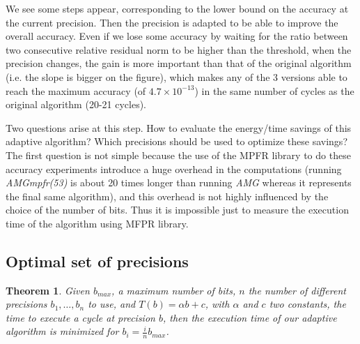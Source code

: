 \documentclass[a4paper,10pt]{article}
\newtheorem{theorem}{Theorem}
\begin{document}
   We see some steps appear, corresponding to the lower bound on the accuracy at the current precision. Then the precision is adapted to be able to improve the overall accuracy. Even if we lose some accuracy by waiting for the ratio
   between two consecutive relative residual norm to be higher than the threshold, when the precision changes, the gain is more important than that of the original algorithm (i.e. the slope is bigger on the figure), which makes any of
   the 3 versions able to reach the maximum accuracy (of $4.7\times 10^{-13}$) in the same number of cycles as the original algorithm (20-21 cycles).
   
   Two questions arise at this step. How to evaluate the energy/time savings of this adaptive algorithm? Which precisions should be used to optimize these savings?\\
   The first question is not simple because the use of the MPFR library to do these accuracy experiments introduce a huge overhead in the computations (running \emph{AMGmpfr(53)} is about 20 times longer than running \emph{AMG} whereas it
   represents the final same algorithm), and this overhead is not highly influenced by the choice of the number of bits. Thus it is impossible just to measure the execution time of the algorithm using MFPR library.
   
   \subsection{Optimal set of precisions}
   
   \begin{theorem}
     Given $b_{max}$, a maximum number of bits, $n$ the number of different precisions $b_1,\dots,b_n$ to use, and $T(b)=\alpha b+c$, with $\alpha$ and $c$ two constants, the time to execute a cycle at precision $b$, then
     the execution time of our adaptive algorithm is minimized for $b_i = \frac{i}{n}b_{max}$.
   \end{theorem}
\end{document}
